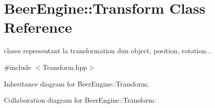 \hypertarget{class_beer_engine_1_1_transform}{}\section{Beer\+Engine\+:\+:Transform Class Reference}
\label{class_beer_engine_1_1_transform}


classe representant la transformation d\textquotesingle{}un object, position, rotation...  




{\ttfamily \#include $<$Transform.\+hpp$>$}



Inheritance diagram for Beer\+Engine\+:\+:Transform\+:


Collaboration diagram for Beer\+Engine\+:\+:Transform\+:
